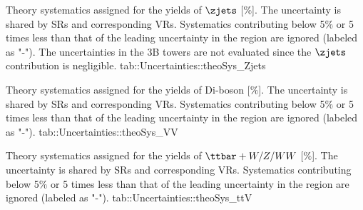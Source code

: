 {Theory systematics assigned for the yields of $\zjets$ [$\%$]. The uncertainty is shared by SRs and corresponding VRs. Systematics contributing below 5$\%$ or 5 times less than that of the leading uncertainty in the region are ignored (labeled as "-"). The uncertainties in the 3B towers are not evaluated since the $\zjets$ contribution is negligible. }
{tab::Uncertainties::theoSys_Zjets}


{Theory systematics assigned for the yields of Di-boson [$\%$]. The uncertainty is shared by SRs and corresponding VRs. Systematics contributing below 5$\%$ or 5 times less than that of the leading uncertainty in the region are ignored (labeled as "-"). }
{tab::Uncertainties::theoSys_VV}


{Theory systematics assigned for the yields of $\ttbar+W/Z/WW$ [$\%$]. The uncertainty is shared by SRs and corresponding VRs. Systematics contributing below 5$\%$ or 5 times less than that of the leading uncertainty in the region are ignored (labeled as "-"). }
{tab::Uncertainties::theoSys_ttV}

